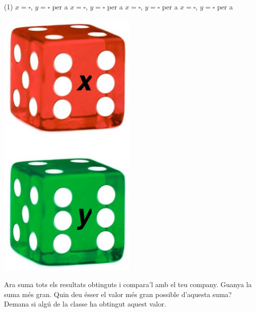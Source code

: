 \begin{mylist}
\begin{minipage}[t]{0.75\textwidth}
	\begin{tasks}(1)
		\task $x=\square$, \qquad $y=\square$ \qquad per a       \vspace{0.25cm}
		\task $x=\square$, \qquad $y=\square$ \qquad per a    \vspace{0.25cm}
		\task $x=\square$, \qquad $y=\square$ \qquad per a     \vspace{0.25cm}
		\task $x=\square$, \qquad $y=\square$ \qquad per a    \vspace{0.25cm}
	\end{tasks}
\end{minipage}
\begin{minipage}{0.24\textwidth}
	\centering
	\vspace{4.5cm}
	\includegraphics[width=0.5\textwidth]{img-05/color-dice}
\end{minipage}
Ara suma tots els resultats obtinguts i compara'l amb el teu company. Guanya la suma més gran. Quin deu ésser el valor més gran possible d'aquesta suma? Demana si algú de la classe ha obtingut aquest valor.
 
\end{mylist}

